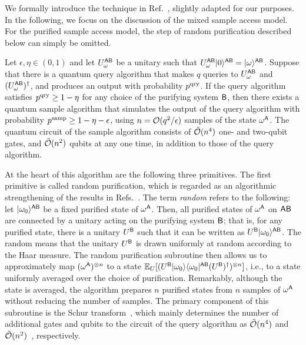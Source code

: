 We formally introduce the technique in Ref.~\cite{tang2025conjugatequerieshelp}, slightly adapted for our purposes.
In the following, we focus on the discussion of the mixed sample access model.
For the purified sample access model, the step of random purification described below can simply be omitted.




\begin{theorem}
\label{thm:sample to query lift}
Let $\epsilon, \eta \in (0, 1)$ and let $U_\omega^{{\mathsf{A}}{\mathsf{B}}}$ be a unitary such that $U_\omega^{{\mathsf{A}}{\mathsf{B}}}|0\rangle^{{\mathsf{A}}{\mathsf{B}}} = |\omega\rangle^{{\mathsf{A}}{\mathsf{B}}}$. Suppose that there is a quantum query algorithm that makes $q$ queries to $U_\omega^{{\mathsf{A}}{\mathsf{B}}}$ and $(U_\omega^{{\mathsf{A}}{\mathsf{B}}})^\dag$, and produces an output with probability $p^{\rm qry}$.
If the query algorithm satisfies $p^{\rm qry} \geq 1 - \eta$ for any choice of the purifying system ${\mathsf{B}}$, then there exists a quantum sample algorithm that simulates the output of the query algorithm with probability $p^{\rm samp} \geq 1 - \eta - \epsilon$, using $n = {\mathcal{O}}(q^2 / \epsilon)$ samples of the state $\omega^{\mathsf{A}}$.
The quantum circuit of the sample algorithm consists of $\tilde{{\mathcal{O}}}(n^4)$ one- and two-qubit gates, and $\tilde{{\mathcal{O}}}(n^2)$ qubits at any one time, in addition to those of the query algorithm.



\end{theorem}



At the heart of this algorithm are the following three primitives.
The first primitive is called random purification, which is regarded as an algorithmic strengthening of the results in Refs.~\cite{Soleimanifar2022testingmatrixproduct, chen2024localtestUniInv}. 
The term \emph{random} refers to the following: let $|\omega_0\rangle^{{\mathsf{A}}{\mathsf{B}}}$ be a fixed purified state of $\omega^{\mathsf{A}}$. Then, all purified states of $\omega^{\mathsf{A}}$ on ${\mathsf{A}}{\mathsf{B}}$ are connected by a unitary acting on the purifying system ${\mathsf{B}}$; that is, for any purified state, there is a unitary $U^{\mathsf{B}}$ such that it can be written as $U^{\mathsf{B}}|\omega_0\rangle^{{\mathsf{A}}{\mathsf{B}}}$.
The random means that the unitary $U^{\mathsf{B}}$ is drawn uniformly at random according to the Haar measure. 
The random purification subroutine then allows us to approximately map $(\omega^{\mathsf{A}})^{\otimes n}$ to a state $\mathbb{E}_U[(U^{\mathsf{B}}|\omega_0\rangle\langle\omega_0|^{{\mathsf{A}}{\mathsf{B}}}(U^{{\mathsf{B}}})^\dag)^{\otimes n}]$, i.e., to a state uniformly averaged over the choice of purification.
Remarkably, although the state is averaged, the algorithm prepares $n$ purified states from $n$ samples of $\omega^{\mathsf{A}}$ without reducing the number of samples.
The primary component of this subroutine is the Schur transform~\cite{harrow2005applicationSchurtrans, Bacon2006efficientcircuitSchur, Krovi2019efficienthigh, Nguyen2024theorynuralnet, burchardt2025highdimensionalschur}, which mainly determines the number of additional gates and qubits to the circuit of the query algorithm as $\tilde{{\mathcal{O}}}(n^4)$ and $\tilde{{\mathcal{O}}}(n^2)$~\cite{burchardt2025highdimensionalschur}, respectively.



